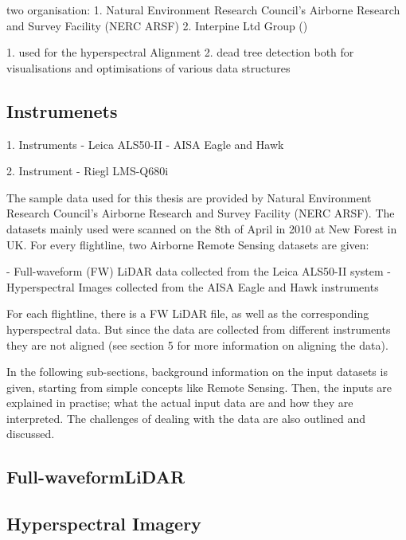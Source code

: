 \documentclass{subfiles}
\begin{document}
two organisation:
	1. Natural Environment Research Council’s Airborne Research and Survey Facility (NERC ARSF)
	2. Interpine Ltd Group () 
	
	1. used for the hyperspectral Alignment
	2. dead tree detection
	both for visualisations and optimisations of various data structures
	
	\subsection{Instrumenets}
	1. Instruments 
		- Leica ALS50-II
		- AISA Eagle and Hawk
		
	2. Instrument
		- Riegl LMS-Q680i
		
	

	The sample data used for this thesis are provided by Natural Environment Research Council’s Airborne Research and Survey Facility (NERC ARSF). The datasets mainly used were scanned on the 8th of April in 2010 at New Forest in UK. For every flightline, two Airborne Remote Sensing datasets are given: 
	
	-	Full-waveform (FW) LiDAR data collected from the Leica ALS50-II system
	-	Hyperspectral Images collected from the AISA Eagle and Hawk instruments
	
	For each flightline, there is a FW LiDAR file, as well as the corresponding hyperspectral data. But since the data are collected from different instruments they are not aligned (see section 5 for more information on aligning the data). 
	
	In the following sub-sections, background information on the input datasets is given, starting from simple concepts like Remote Sensing. Then, the inputs are explained in practise; what the actual input data are and how they are interpreted. The challenges of dealing with the data are also outlined and discussed. 



	\subsection{Full-waveformLiDAR}
	


	
	\subsection{Hyperspectral Imagery}
	
	
\end{document}
